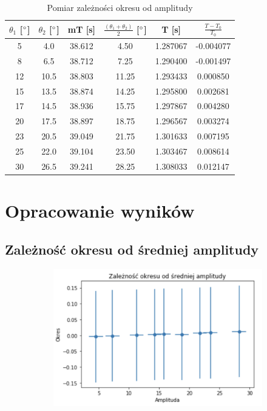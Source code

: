 \documentclass[a4paper,12pt]{article}
\begin{document}
\begin{justify}
\begin{table}[H]
\begin{center}
\begin{scriptsize}
\begin{tabular}{|c|c|c|c|c|c|}
\hline
$\theta_{1}$ [$\degree$]  & $\theta_{2}$ [$\degree$]  & mT [s]  & $\frac{(\theta_{1} + \theta_{2})}{2}$ [$\degree$]  & T [s]  & $\frac{T - T_{0}}{T_{0}}$ \\
\hline
5  & 4.0  & 38.612  & 4.50  & 1.287067  & -0.004077 \\
8  & 6.5  & 38.712  & 7.25  & 1.290400  & -0.001497 \\
12  & 10.5  & 38.803  & 11.25  & 1.293433  & 0.000850 \\
15  & 13.5  & 38.874  & 14.25  & 1.295800  & 0.002681 \\
17  & 14.5  & 38.936  & 15.75  & 1.297867  & 0.004280 \\
20  & 17.5  & 38.897  & 18.75  & 1.296567  & 0.003274 \\
23  & 20.5  & 39.049  & 21.75  & 1.301633  & 0.007195 \\
25  & 22.0  & 39.104  & 23.50  & 1.303467  & 0.008614 \\
30  & 26.5  & 39.241  & 28.25  & 1.308033  & 0.012147 \\
\hline
\end{tabular}
\caption{Pomiar zależności okresu od amplitudy }
\end{scriptsize}
\end{center}
\end{table}

\section{Opracowanie wyników}

\subsection{Zależność okresu od średniej amplitudy}

\begin{figure}[h]
\centering
\includegraphics[width=12cm, height=6cm]{okr_ampl}
\end{figure}


\end{justify}
\end{document}
